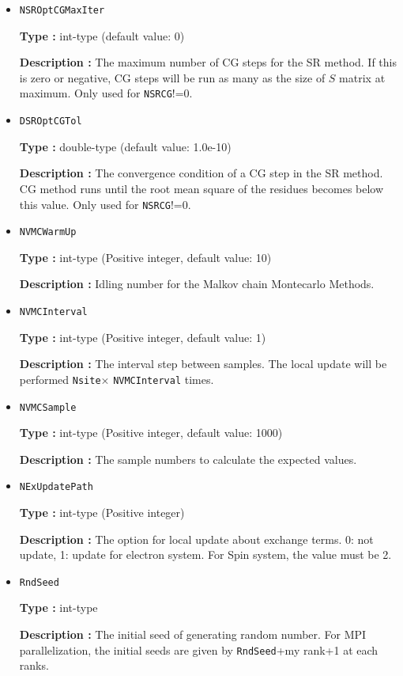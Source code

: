 \begin{itemize}
{\bf Description :} The time step using in the SR method. 

\item \verb|NSROptCGMaxIter|

{\bf Type :} int-type (default value: 0)

{\bf Description :} The maximum number of CG steps for the SR method. If this is zero or negative, CG steps will be run as many as the size of $S$ matrix at maximum. Only used for \verb|NSRCG|!=0.
 
\item \verb|DSROptCGTol|

{\bf Type :} double-type (default value: 1.0e-10)

{\bf Description :} The convergence condition of a CG step in the SR method. CG method runs until the root mean square of the residues becomes below this value. Only used for \verb|NSRCG|!=0.
 
\item \verb|NVMCWarmUp|

{\bf Type :} int-type (Positive integer, default value: 10)

{\bf Description :} Idling number for the Malkov chain Montecarlo Methods.

\item \verb|NVMCInterval|

{\bf Type :} int-type (Positive integer, default value: 1)

{\bf Description :} The interval step between samples. The local update will be performed \verb|Nsite|× \verb|NVMCInterval| times.

\item \verb|NVMCSample|

{\bf Type :} int-type (Positive integer, default value: 1000)

{\bf Description :} The sample numbers to calculate the expected values.

\item \verb|NExUpdatePath|

{\bf Type :} int-type (Positive integer)

{\bf Description :}  The option for local update about exchange terms. 0: not update, 1: update for electron system. For Spin system, the value must be 2.

\item \verb|RndSeed|

{\bf Type :} int-type 

{\bf Description :} The initial seed of generating random number. For MPI parallelization, the initial seeds are given by \verb|RndSeed|+my rank+1 at each ranks. 


\end{itemize}
